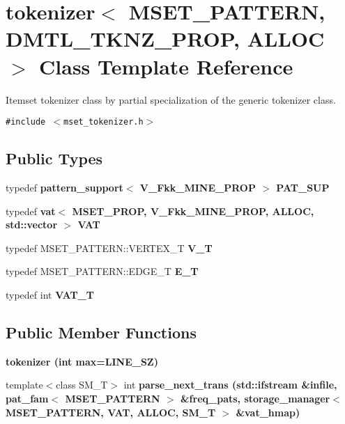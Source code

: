\section{tokenizer$<$ MSET\_\-PATTERN, DMTL\_\-TKNZ\_\-PROP, ALLOC $>$ Class Template Reference}
\label{classtokenizer_3_01MSET__PATTERN_00_01DMTL__TKNZ__PROP_00_01ALLOC_01_4}
Itemset tokenizer class by partial specialization of the generic tokenizer class.  


{\tt \#include $<$mset\_\-tokenizer.h$>$}

\subsection*{Public Types}
\begin{CompactItemize}
\item 
typedef \bf{pattern\_\-support}$<$ V\_\-Fkk\_\-MINE\_\-PROP $>$ \textbf{PAT\_\-SUP}\label{classtokenizer_3_01MSET__PATTERN_00_01DMTL__TKNZ__PROP_00_01ALLOC_01_4_603073e1ce1264c2932ed852b6f91d1a}

\item 
typedef \bf{vat}$<$ MSET\_\-PROP, V\_\-Fkk\_\-MINE\_\-PROP, ALLOC, std::vector $>$ \textbf{VAT}\label{classtokenizer_3_01MSET__PATTERN_00_01DMTL__TKNZ__PROP_00_01ALLOC_01_4_57f7aad3e3046b761355c9e6988c5cfc}

\item 
typedef MSET\_\-PATTERN::VERTEX\_\-T \textbf{V\_\-T}\label{classtokenizer_3_01MSET__PATTERN_00_01DMTL__TKNZ__PROP_00_01ALLOC_01_4_a6aeaa973d378bc358fc5136ba789349}

\item 
typedef MSET\_\-PATTERN::EDGE\_\-T \textbf{E\_\-T}\label{classtokenizer_3_01MSET__PATTERN_00_01DMTL__TKNZ__PROP_00_01ALLOC_01_4_381f4f70f80361ff7e8b4dffe1f850b8}

\item 
typedef int \bf{VAT\_\-T}
\end{CompactItemize}
\subsection*{Public Member Functions}
\begin{CompactItemize}
\item 
\bf{tokenizer} (int max=LINE\_\-SZ)
\item 
template$<$class SM\_\-T$>$ int \bf{parse\_\-next\_\-trans} (std::ifstream \&infile, \bf{pat\_\-fam}$<$ MSET\_\-PATTERN $>$ \&freq\_\-pats, \bf{storage\_\-manager}$<$ MSET\_\-PATTERN, \bf{VAT}, ALLOC, SM\_\-T $>$ \&vat\_\-hmap)
\end{CompactItemize}


